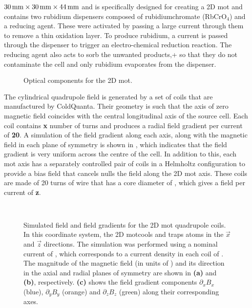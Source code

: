 \(\sivalue{30}{\milli\metre} \times \sivalue{30}{\milli\metre} \times
\sivalue{44}{\milli\metre}\) and is specifically designed for creating a 2D\+
\ac{mot} and contains two rubidium dispensers composed of rubidiumchromate
(RbCrO\(_4\)) and a reducing agent. These were activated by passing a large
current through them to remove a thin oxidation layer. To produce rubidium, a
current is passed through the dispenser to trigger an electro-chemical
reduction reaction. The reducing agent also acts to sorb the unwanted
products,+ so that they do not contaminate the cell and only rubidium
evaporates from the dispenser.
\begin{figure}
	\centering
	\def\svgwidth{0.5\textwidth}
	
	\caption[Optical components for the 2D \ac{mot}]{Optical components for the 2D \ac{mot}.}
	\label{fig:2D_mot_optics}
\end{figure} 
\par\noindent
The cylindrical quadrupole field is generated by a set of coils that are
manufactured by ColdQuanta. Their geometry is such that the axis of zero
magnetic field coincides with the central longitudinal axis of the source
cell. Each coil contains {\textbf {x}} number of turns and produces a radial
field gradient per current of {\textbf
		{20}}\;\sivalue{}{\gauss\per\centi\metre\per\ampere}. A simulation of the
field gradient along each axis, along with the magnetic field in each plane
of symmetry is shown in , which
indicates that the field gradient is very uniform across the centre of the
cell. In addition to this, each \ac{mot} axis has a separately controlled
pair of coils in a Helmholtz configuration to provide a bias field that
cancels nulls the field along the 2D \ac{mot} axis. These coils are made of
20 turns of wire that has a core diameter of , which
gives a field per current of {\textbf{z}}\;\sivalue{}{\gauss\per\ampere}.
\begin{figure}
	\centering
	\def\svgwidth{\columnwidth}
	\\
	\caption[Simulated field and field gradients for the 2D \ac{mot} quadrupole
		coils]{Simulated field and field gradients for the 2D \ac{mot} quadrupole
		coils. In
		this coordinate system, the 2D \ac{mot}cools and traps atoms in the
		\(\vec{x}\) and \(\vec{z}\) directions. The simulation was performed using a
		nominal current of , which corresponds to a current
		density in each coil of . The
		magnitude of the magnetic field (in units of \sivalue{}{\gauss}) and its
		direction in the axial and radial planes of symmetry are shown in
		\textbf{(a)} and \textbf{(b)}, respectively. \textbf{(c)} shows the field
		gradient components \(\partial_x B_x\) (blue), \(\partial_y B_y\) (orange)
		and \(\partial_z B_z\) (green) along their corresponding axes.}
	\label{fig:2d_mot_field_gradient}
\end{figure}
